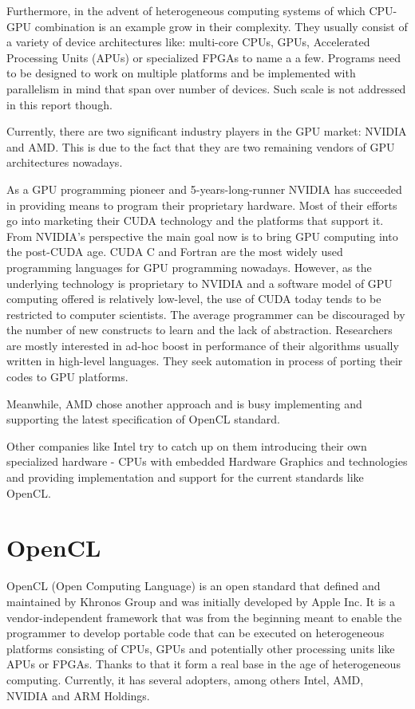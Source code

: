 Furthermore, in the advent of heterogeneous computing systems of which CPU-GPU combination is an example grow in their complexity. They usually consist of a variety of device architectures like: multi-core CPUs, GPUs, Accelerated Processing Units (APUs) or specialized FPGAs to name a a few. Programs need to be designed to work on multiple platforms and be implemented with parallelism in mind that span over number of devices. Such scale is not addressed in this report though.

Currently, there are two significant industry players in the GPU market: NVIDIA and AMD. This is due to the fact that they are two remaining vendors of GPU architectures nowadays. 

As a GPU programming pioneer and 5-years-long-runner NVIDIA has succeeded in providing means to program their proprietary hardware. Most of their efforts go into marketing their CUDA technology and the platforms that support it. From NVIDIA's perspective the main goal now is to bring GPU computing into the post-CUDA age. CUDA C and Fortran are the most widely used programming languages for GPU programming nowadays. However, as the underlying technology is proprietary to NVIDIA and a software model of GPU computing offered is relatively low-level, the use of CUDA today tends to be restricted to computer scientists. The average programmer can be discouraged by the number of new constructs to learn and the lack of abstraction. Researchers are mostly interested in ad-hoc boost in performance of their algorithms usually written in high-level languages. They seek automation in process of porting their codes to GPU platforms.

Meanwhile, AMD chose another approach and is busy implementing and supporting the latest specification of OpenCL standard.

Other companies like Intel try to catch up on them introducing their own specialized hardware - CPUs with embedded Hardware Graphics and technologies and providing implementation and support for the current standards like OpenCL.




\section{OpenCL}
OpenCL (Open Computing Language) is an open standard that defined and maintained by Khronos Group and was initially developed by Apple Inc. It is a vendor-independent framework that was from the beginning meant to enable the programmer to develop portable code that can be executed on heterogeneous platforms consisting of CPUs, GPUs and potentially other processing units like APUs or FPGAs. Thanks to that it form a real base in the age of heterogeneous computing. Currently, it has several adopters, among others Intel, AMD, NVIDIA and ARM Holdings.

